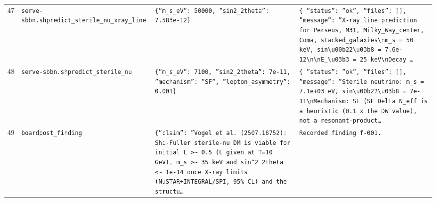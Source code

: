 \documentclass[11pt,a4paper]{article}
\begin{document}
\begin{longtable}{@{}p{}p{}p{}p{}@{}}
47 & \texttt{serve-sbbn.sh}\newline\texttt{predict\_\allowbreak{}sterile\_\allowbreak{}nu\_\allowbreak{}xray\_\allowbreak{}line} & \texttt{\{''m\_\allowbreak{}s\_\allowbreak{}eV'':\allowbreak{} 50000,\allowbreak{} ''sin2\_\allowbreak{}2theta'':\allowbreak{} 7.583e-12\}\allowbreak{}} & \texttt{\{   ''status'':\allowbreak{} ''ok'',\allowbreak{}   ''files'':\allowbreak{} []\allowbreak{},\allowbreak{}   ''message'':\allowbreak{} ''X-ray line prediction for Perseus,\allowbreak{} M31,\allowbreak{} Milky\_\allowbreak{}Way\_\allowbreak{}center,\allowbreak{} Coma,\allowbreak{} stacked\_\allowbreak{}galaxies\textbackslash{}\allowbreak{}nm\_\allowbreak{}s =\allowbreak{} 50 keV,\allowbreak{} sin\textbackslash{}\allowbreak{}u00b22\textbackslash{}\allowbreak{}u03b8 =\allowbreak{} 7.6e-12\textbackslash{}\allowbreak{}n\textbackslash{}\allowbreak{}nE\_\allowbreak{}\textbackslash{}\allowbreak{}u03b3 =\allowbreak{} 25 keV\textbackslash{}\allowbreak{}nDecay \ldots{}\allowbreak{}} \\
48 & \texttt{serve-sbbn.sh}\newline\texttt{predict\_\allowbreak{}sterile\_\allowbreak{}nu} & \texttt{\{''m\_\allowbreak{}s\_\allowbreak{}eV'':\allowbreak{} 7100,\allowbreak{} ''sin2\_\allowbreak{}2theta'':\allowbreak{} 7e-11,\allowbreak{} ''mechanism'':\allowbreak{} ''SF'',\allowbreak{} ''lepton\_\allowbreak{}asymmetry'':\allowbreak{} 0.001\}\allowbreak{}} & \texttt{\{   ''status'':\allowbreak{} ''ok'',\allowbreak{}   ''files'':\allowbreak{} []\allowbreak{},\allowbreak{}   ''message'':\allowbreak{} ''Sterile neutrino:\allowbreak{} m\_\allowbreak{}s =\allowbreak{} 7.1e+03 eV,\allowbreak{} sin\textbackslash{}\allowbreak{}u00b22\textbackslash{}\allowbreak{}u03b8 =\allowbreak{} 7e-11\textbackslash{}\allowbreak{}nMechanism:\allowbreak{} SF (SF Delta N\_\allowbreak{}eff is a heuristic (0.1 x the DW value)\allowbreak{},\allowbreak{} not a resonant-product\ldots{}\allowbreak{}} \\
49 & \texttt{board}\newline\texttt{post\_\allowbreak{}finding} & \texttt{\{''claim'':\allowbreak{} ''Vogel et al. (2507.18752)\allowbreak{}:\allowbreak{} Shi-Fuller sterile-nu DM is viable for initial L \textgreater{}\allowbreak{}\textasciitilde{}\allowbreak{} 0.5 (L given at T=\allowbreak{}10 GeV)\allowbreak{},\allowbreak{} m\_\allowbreak{}s \textgreater{}\allowbreak{}\textasciitilde{}\allowbreak{} 35 keV and sin\textasciicircum{}\allowbreak{}2 2theta \textless{}\allowbreak{}\textasciitilde{}\allowbreak{} 1e-14 once X-ray limits (NuSTAR+INTEGRAL/\allowbreak{}SPI,\allowbreak{} 95\% CL)\allowbreak{} and the structu\ldots{}\allowbreak{}} & \texttt{Recorded finding f-001.} \\

\end{longtable}
\end{document}
